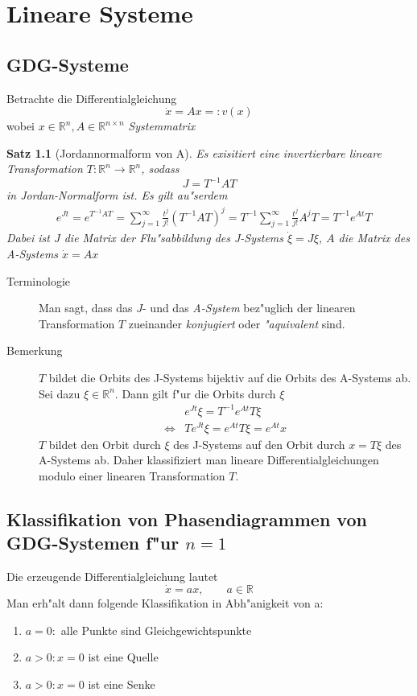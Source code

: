 \documentclass[a4paper, 13pt]{scrreprt}
\newtheorem{satz}{Satz}[section]
\theoremstyle{definition} \newtheorem{definition}{Definition}[section]
\newcommand{\RR}{\mathbb{R}}
\begin{document}
\chapter{Lineare Systeme}

\section{GDG-Systeme}
Betrachte die Differentialgleichung
	\[\dot{x} = Ax =: v(x)\]
wobei $x\in\RR^n, A \in \RR^{n\times n}$ \emph{Systemmatrix}
\begin{satz}[Jordannormalform von A]
Es exisitiert eine invertierbare lineare Transformation $T:\RR^n \to \RR^n $, sodass 
$$ J = T ^{-1} A T$$
in Jordan-Normalform ist. Es gilt au"serdem
	\begin{align*}
	& e^{Jt} = e^{T^{-1}AT} = \sum_{j=1}^{\infty} \frac{t^j}{j!} (T^{-1}AT)^j = T^{-1} \sum_{j=1}^{\infty} \frac{t^j}{j!} A^j T = T^{-1} e^{At} T
	\end{align*}
	Dabei ist \(J\) die Matrix der Flu"sabbildung des \emph{J-Systems} \(\dot{\xi} = J\xi\), \(A\) die Matrix des \emph{A-Systems} \(\dot{x} = Ax\)
\end{satz}
	
\begin{description}
\item[Terminologie]
Man sagt, dass das \(J\)- und das \emph{A-System} bez"uglich der linearen Transformation \(T\) zueinander \emph{konjugiert} oder \emph{"aquivalent} sind.
\end{description}

\begin{description}
\item[Bemerkung]
 \(T\) bildet die Orbits des J-Systems bijektiv auf die Orbits des A-Systems ab. Sei dazu \(\xi \in \RR^n\). Dann gilt f"ur die Orbits durch $\xi$
\begin{align*}
	 & e^{Jt} \xi  = T^{-1}e^{At} T \xi \\
	\Leftrightarrow & Te^{Jt} \xi = e^{At}T\xi = e^{At}x
\end{align*}
\(T\) bildet den Orbit durch \(\xi\) des J-Systems  auf den Orbit durch \(x = T\xi\) des A-Systems  ab.
Daher klassifiziert man lineare Differentialgleichungen modulo einer linearen Transformation $T$.

\end{description}


\section{Klassifikation von Phasendiagrammen von GDG-Systemen f"ur $n=1$}
Die erzeugende Differentialgleichung lautet
	\[ \dot{x} = ax, \qquad a \in \RR \]
Man erh"alt dann folgende Klassifikation in Abh"anigkeit von a:
	\begin{enumerate}
		\item $a=0: $ alle Punkte sind Gleichgewichtspunkte
		\item $a > 0: x = 0$ ist eine Quelle
		\item $a > 0: x = 0 $ ist eine Senke
	\end{enumerate}
\end{document}

